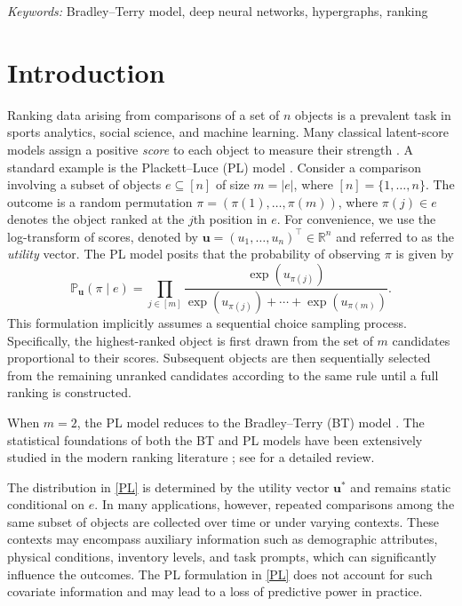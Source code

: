 \documentclass[
  12pt]{article}
\begin{document}
\noindent%
{\it Keywords:}  Bradley--Terry model, deep neural networks,  hypergraphs, ranking 
\vfill

\newpage
{} %



\section{Introduction}\label{sec:intro}
Ranking data arising from comparisons of a set of $n$ objects is a prevalent task in sports analytics, social science, and machine learning. Many classical latent-score models assign a positive \textit{score} to each object to measure their strength \citep{thurstone1927method, zermelo1929berechnung}. A standard example is the Plackett--Luce (PL) model \citep{luce1959individual, plackett1975analysis}. Consider a comparison involving a subset of objects $e \subseteq [n]$ of size $m=|e|$, where $[n]=\{1,\ldots,n\}$. The outcome is a random permutation $\pi = (\pi(1), \ldots, \pi(m))$, where $\pi(j) \in e$ denotes the object ranked at the $j$th position in $e$. For convenience, we use the log-transform of scores, denoted by $\bm u = (u_1, \ldots, u_n)^\top\in\mathbb R^n$ and referred to as the \textit{utility} vector. The PL model posits that the probability of observing $\pi$ is given by
\begin{equation}
\label{PL}
    \mathbb{P}_{\boldsymbol{u}}\left(\pi \mid e\right)=\prod_{j \in[m]} \frac{\exp (u_{\pi(j)})}{ \exp (u_{\pi(j)})+\cdots + \exp (u_{\pi(m)})}.
\end{equation}
This formulation implicitly assumes a sequential choice sampling process. Specifically, the highest-ranked object is first drawn from the set of 
$m$ candidates proportional to their scores. Subsequent objects are then sequentially selected from the remaining unranked candidates according to the same rule until a full ranking is constructed.



When $m=2$, the PL model reduces to the Bradley--Terry (BT) model \citep{bradley1952rank}. The statistical foundations of both the BT and PL models have been extensively studied in the modern ranking literature \citep{simons1999asymptotics,hunter2004mm, MR2987494,shah2016estimation,Negahban2017rank,chen2019spectral,chen2022partial,gao2023uncertainty,fan2024uncertainty,han2025unifiedanalysis,fan2025spectral}; see \cite{fang2026recent} for a detailed review.

The distribution in \eqref{PL} is determined by the utility vector $\bm u^*$ and remains static conditional on $e$. In many applications, however, repeated comparisons among the same subset of objects are collected over time or under varying contexts.  
These contexts may encompass auxiliary information such as demographic attributes, physical conditions, inventory levels, and task prompts, which can significantly influence the outcomes. The PL formulation in \eqref{PL} does not account for such covariate information and may lead to a loss of predictive power in practice.
\end{document}
